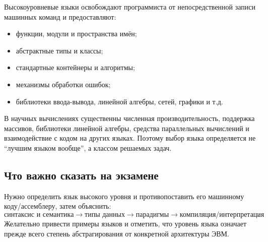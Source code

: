 Высокоуровневые языки освобождают программиста от непосредственной записи машинных команд и предоставляют:
\begin{itemize}
\item функции, модули и пространства имён;
\item абстрактные типы и классы;
\item стандартные контейнеры и алгоритмы;
\item механизмы обработки ошибок;
\item библиотеки ввода-вывода, линейной алгебры, сетей, графики и т.д.
\end{itemize}

В научных вычислениях существенны численная производительность, поддержка массивов, библиотеки линейной алгебры, средства параллельных вычислений и взаимодействие с кодом на других языках. Поэтому выбор языка определяется не ``лучшим языком вообще'', а классом решаемых задач.

\subsection{Что важно сказать на экзамене}

Нужно определить язык высокого уровня и противопоставить его машинному коду/ассемблеру, затем объяснить:
\[
\boxed{\text{синтаксис и семантика}
\rightarrow
\text{типы данных}
\rightarrow
\text{парадигмы}
\rightarrow
\text{компиляция/интерпретация}}.
\]
Желательно привести примеры языков и отметить, что уровень языка означает прежде всего степень абстрагирования от конкретной архитектуры ЭВМ.

\newpage

